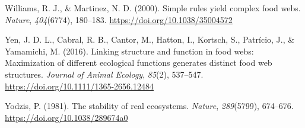 \documentclass[
]{article}
\newlength{\cslhangindent}
\newenvironment{CSLReferences}[2] %
 {\begin{list}{}{%
  \setlength{\itemindent}{0pt}
  \setlength{\leftmargin}{0pt}
  \setlength{\parsep}{0pt}
  \ifodd #1
   \setlength{\leftmargin}{\cslhangindent}
   \setlength{\itemindent}{-1\cslhangindent}
  \fi
  \setlength{\itemsep}{#2\baselineskip}}}
 {\end{list}}
\begin{document}
\begin{CSLReferences}{1}{0}
Williams, R. J., \& Martinez, N. D. (2000). Simple rules yield complex
food webs. \emph{Nature}, \emph{404}(6774), 180--183.
\url{https://doi.org/10.1038/35004572}

Yen, J. D. L., Cabral, R. B., Cantor, M., Hatton, I., Kortsch, S.,
Patrício, J., \& Yamamichi, M. (2016). Linking structure and function in
food webs: Maximization of different ecological functions generates
distinct food web structures. \emph{Journal of Animal Ecology},
\emph{85}(2), 537--547. \url{https://doi.org/10.1111/1365-2656.12484}

Yodzis, P. (1981). The stability of real ecosystems. \emph{Nature},
\emph{289}(5799), 674--676. \url{https://doi.org/10.1038/289674a0}

\end{CSLReferences}
\end{document}
